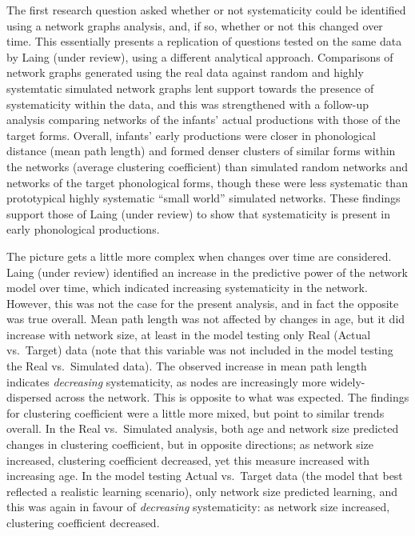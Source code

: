 \documentclass[
  man]{apa6}
\begin{document}
The first research question asked whether or not systematicity could be identified using a network graphs analysis, and, if so, whether or not this changed over time. This essentially presents a replication of questions tested on the same data by Laing (under review), using a different analytical approach. Comparisons of network graphs generated using the real data against random and highly systemtatic simulated network graphs lent support towards the presence of systematicity within the data, and this was strengthened with a follow-up analysis comparing networks of the infants' actual productions with those of the target forms. Overall, infants' early productions were closer in phonological distance (mean path length) and formed denser clusters of similar forms within the networks (average clustering coefficient) than simulated random networks and networks of the target phonological forms, though these were less systematic than prototypical highly systematic ``small world'' simulated networks. These findings support those of Laing (under review) to show that systematicity is present in early phonological productions.

The picture gets a little more complex when changes over time are considered. Laing (under review) identified an increase in the predictive power of the network model over time, which indicated increasing systematicity in the network. However, this was not the case for the present analysis, and in fact the opposite was true overall. Mean path length was not affected by changes in age, but it did increase with network size, at least in the model testing only Real (Actual vs.~Target) data (note that this variable was not included in the model testing the Real vs.~Simulated data). The observed increase in mean path length indicates \emph{decreasing} systematicity, as nodes are increasingly more widely-dispersed across the network. This is opposite to what was expected. The findings for clustering coefficient were a little more mixed, but point to similar trends overall. In the Real vs.~Simulated analysis, both age and network size predicted changes in clustering coefficient, but in opposite directions; as network size increased, clustering coefficient decreased, yet this measure increased with increasing age. In the model testing Actual vs.~Target data (the model that best reflected a realistic learning scenario), only network size predicted learning, and this was again in favour of \emph{decreasing} systematicity: as network size increased, clustering coefficient decreased.
\end{document}
